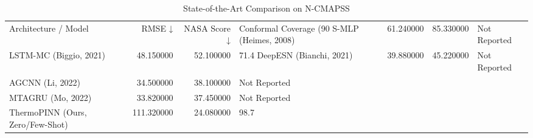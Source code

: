 \begin{table}
\caption{State-of-the-Art Comparison on N-CMAPSS}
\label{tab:sota}
\begin{tabular}{lrrl}
\toprule
Architecture / Model & RMSE ↓ & NASA Score ↓ & Conformal Coverage (90%
\midrule
S-MLP (Heimes, 2008) & 61.240000 & 85.330000 & Not Reported \\
LSTM-MC (Biggio, 2021) & 48.150000 & 52.100000 & 71.4%
DeepESN (Bianchi, 2021) & 39.880000 & 45.220000 & Not Reported \\
AGCNN (Li, 2022) & 34.500000 & 38.100000 & Not Reported \\
MTAGRU (Mo, 2022) & 33.820000 & 37.450000 & Not Reported \\
ThermoPINN (Ours, Zero/Few-Shot) & 111.320000 & 24.080000 & 98.7%
\bottomrule
\end{tabular}
\end{table}
